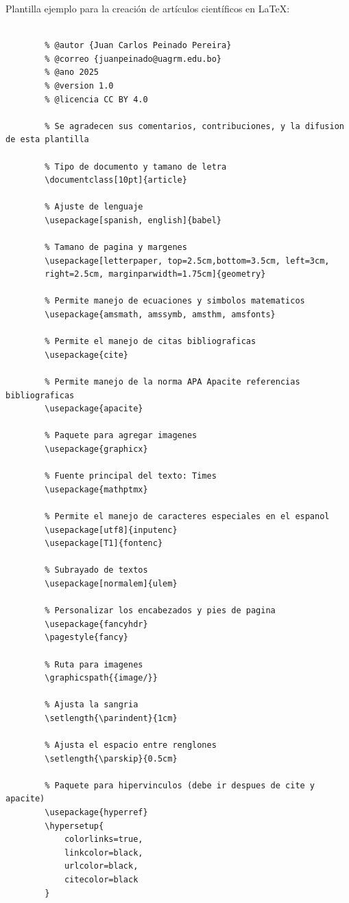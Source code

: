 \documentclass[12pt,twocolumn]{article}
\begin{document}
    Plantilla ejemplo para la creación de artículos científicos en LaTeX:

    \begin{lstlisting}[style=mystyle]
      
        % @autor {Juan Carlos Peinado Pereira}
        % @correo {juanpeinado@uagrm.edu.bo}
        % @ano 2025
        % @version 1.0
        % @licencia CC BY 4.0
    
        % Se agradecen sus comentarios, contribuciones, y la difusion de esta plantilla
        
        % Tipo de documento y tamano de letra
        \documentclass[10pt]{article}
        
        % Ajuste de lenguaje
        \usepackage[spanish, english]{babel}
        
        % Tamano de pagina y margenes
        \usepackage[letterpaper, top=2.5cm,bottom=3.5cm, left=3cm, 
        right=2.5cm, marginparwidth=1.75cm]{geometry}
        
        % Permite manejo de ecuaciones y simbolos matematicos
        \usepackage{amsmath, amssymb, amsthm, amsfonts}
        
        % Permite el manejo de citas bibliograficas
        \usepackage{cite}
        
        % Permite manejo de la norma APA Apacite referencias bibliograficas
        \usepackage{apacite}
        
        % Paquete para agregar imagenes
        \usepackage{graphicx}
        
        % Fuente principal del texto: Times
        \usepackage{mathptmx}
        
        % Permite el manejo de caracteres especiales en el espanol
        \usepackage[utf8]{inputenc} 
        \usepackage[T1]{fontenc}
        
        % Subrayado de textos
        \usepackage[normalem]{ulem}
        
        % Personalizar los encabezados y pies de pagina
        \usepackage{fancyhdr}
        \pagestyle{fancy}
        
        % Ruta para imagenes
        \graphicspath{{image/}}
        
        % Ajusta la sangria
        \setlength{\parindent}{1cm}
        
        % Ajusta el espacio entre renglones
        \setlength{\parskip}{0.5cm}
        
        % Paquete para hipervinculos (debe ir despues de cite y apacite)
        \usepackage{hyperref}
        \hypersetup{
            colorlinks=true,
            linkcolor=black,
            urlcolor=black,
            citecolor=black
        }
        

\end{lstlisting}
\end{document}
